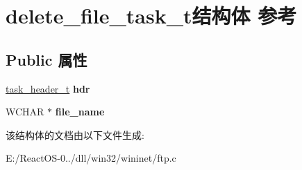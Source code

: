 \hypertarget{structdelete__file__task__t}{}\section{delete\+\_\+file\+\_\+task\+\_\+t结构体 参考}
\label{structdelete__file__task__t}
\subsection*{Public 属性}
\begin{DoxyCompactItemize}
\item 
\mbox{\label{structdelete__file__task__t_ad59b7c562b4c6bbc759dacc3afd566b6}} 
\hyperlink{structtask__header__t}{task\+\_\+header\+\_\+t} {\bfseries hdr}
\item 
\mbox{\label{structdelete__file__task__t_a10c94a012bd2f287df68ced776899dbc}} 
W\+C\+H\+AR $\ast$ {\bfseries file\+\_\+name}
\end{DoxyCompactItemize}


该结构体的文档由以下文件生成\+:\begin{DoxyCompactItemize}
\item 
E\+:/\+React\+O\+S-\/0../dll/win32/wininet/ftp.\+c\end{DoxyCompactItemize}
